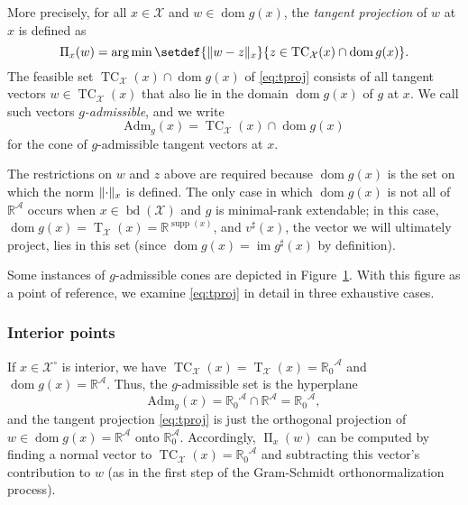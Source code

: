 \documentclass[reqno]{amsart}
\DeclarePairedDelimiter{\norm}{\lVert}{\rVert}
\theoremstyle{plain}
\theoremstyle{definition}
\theoremstyle{remark}
\numberwithin{equation}{section}
\numberwithin{theorem}{section}
\begin{document}
\begin{figure}
\footnotesize

\label{fig:cones}
\end{figure}

More precisely, for all $x \in {\mathcal{X}}$ and $w\in{\operatorname{dom} g}(x)$, the \emph{tangent projection} of $w$ at $x$ is defined as
\begin{equation}
\label{eq:tproj}
\operatorname{\Pi}_{x}(w)
	= \operatorname*{arg\,min} \setdef{\norm{w - z}_{x}}{z\in\operatorname{TC}_{\mathcal{X}}(x)\cap{\operatorname{dom} g}(x)}.
\end{equation}
The feasible set $\operatorname{TC}_{\mathcal{X}}(x)\cap{\operatorname{dom} g}(x)$ of \eqref{eq:tproj} consists of all tangent vectors $w\in\operatorname{TC}_{\mathcal{X}}(x)$ that also lie in the domain ${\operatorname{dom} g}(x)$ of $g$ at $x$.
We call such vectors \emph{$g$-admissible}, and we write
\begin{equation}
{\textrm{Adm}_{g}}(x)
	= \operatorname{TC}_{\mathcal{X}}(x)\cap{\operatorname{dom} g}(x)
\end{equation}
for the cone of $g$-admissible tangent vectors at $x$.

The restrictions on $w$ and $z$ above are required because ${\operatorname{dom} g}(x)$ is the set on which the norm $\norm{\cdot}_{x}$ is defined.
The only case in which  ${\operatorname{dom} g}(x)$ is not all of  ${\mathbb{R}}^{\mathcal{A}}$ occurs when $x \in \operatorname{bd}({\mathcal{X}})$ and $g$ is minimal-rank extendable;
in this case, ${\operatorname{dom} g}(x) = \operatorname{T}_{\mathcal{X}}(x) = {\mathbb{R}}^{\operatorname{supp}(x)}$, and ${v}^{\sharp}(x)$, the vector we will ultimately project, lies in this set (since ${\operatorname{dom} g}(x) = \operatorname{im} g^{\sharp}(x)$ by definition).  

Some instances of $g$-admissible cones are depicted in Figure~\ref{fig:cones}.
With this figure as a point of reference, we examine \eqref{eq:tproj} in detail in three exhaustive cases.

\subsubsection*{Interior points}
If $x \in {{\mathcal{X}}^{\circ}}$ is interior, we have $\operatorname{TC}_{\mathcal{X}}(x) = \operatorname{T}_{\mathcal{X}}(x) = {{\mathbb{R}}_{0}}^{\mathcal{A}}$ and ${\operatorname{dom} g}(x) = {\mathbb{R}}^{\mathcal{A}}$.
Thus, the $g$-admissible set is the hyperplane
\begin{equation}
\label{eq:ProjDomInt}
{\textrm{Adm}_{g}}(x)
	= {{\mathbb{R}}_{0}}^{\mathcal{A}} \cap {\mathbb{R}}^{\mathcal{A}}
	= {{\mathbb{R}}_{0}}^{\mathcal{A}},
\end{equation}
and the tangent projection \eqref{eq:tproj} is just the orthogonal projection of $w\in{\operatorname{dom} g}(x) = {\mathbb{R}}^{\mathcal{A}}$ onto ${\mathbb{R}}^{\mathcal{A}}_0$.
Accordingly, $\operatorname{\Pi}_{x}(w)$ can be computed by finding a normal vector to $\operatorname{TC}_{\mathcal{X}}(x)={{\mathbb{R}}_{0}}^{\mathcal{A}}$ and subtracting this vector's contribution to $w$ (as in the first step of the Gram-Schmidt orthonormalization process).
\end{document}
